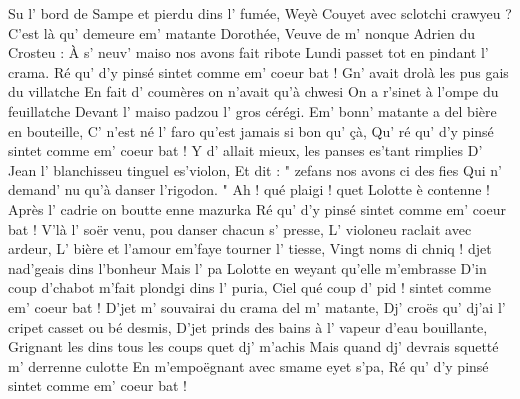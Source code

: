\footnotemark [ititle={Lolotte}]

\beginverse
Su l' bord de Sampe et pierdu dins l' fumée,
Weyè Couyet avec sclotchi crawyeu ?
C'est là qu' demeure em' matante Dorothée,
Veuve de m' nonque Adrien du Crosteu :
À s' neuv' maiso nos avons fait ribote
Lundi passet tot en pindant l' crama.
Ré qu' d'y pinsé sintet comme em' coeur bat ! 
\endverse
\beginverse
Gn' avait drolà les pus gais du villatche
En fait d' coumères on n'avait qu'à chwesi
On a r'sinet à l'ompe du feuillatche
Devant l' maiso padzou l' gros cérégi.
Em' bonn' matante a del bière en bouteille,
C' n'est né l' faro qu'est jamais si bon qu' çà,
Qu' ré qu' d'y pinsé sintet comme em' coeur bat ! 
\endverse
\beginverse
Y d' allait mieux, les panses es'tant rimplies
D' Jean l' blanchisseu tinguel es'violon,
Et dit : " zefans nos avons ci des fies
Qui n' demand' nu qu'à danser l'rigodon. "
Ah ! qué plaigi ! quet Lolotte è contenne !
Après l' cadrie on boutte enne mazurka
Ré qu' d'y pinsé sintet comme em' coeur bat ! 
\endverse
\beginverse
V'là l' soër venu, pou danser chacun s' presse,
L' violoneu raclait avec ardeur,
L' bière et l'amour em'faye tourner l' tiesse,
Vingt noms di chniq ! djet nad'geais dins l'bonheur
Mais l' pa Lolotte en weyant qu'elle m'embrasse
D'in coup d'chabot m'fait plondgi dins l' puria,
Ciel qué coup d' pid ! sintet comme em' coeur bat ! 
\endverse
\beginverse
D'jet m' souvairai du crama del m' matante,
Dj' croës qu' dj'ai l' cripet casset ou bé desmis,
D'jet prinds des bains à l' vapeur d'eau bouillante,
Grignant les dins tous les coups quet dj' m'achis
Mais quand dj' devrais squetté m' derrenne culotte
En m'empoëgnant avec smame eyet s'pa,
Ré qu' d'y pinsé sintet comme em' coeur bat ! 
\endverse
\endsong